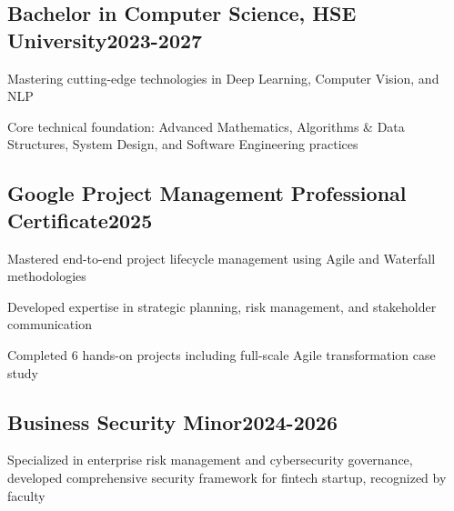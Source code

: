 \subsection{{Bachelor in Computer Science, HSE University}\hfill 2023-2027}
\begin{zitemize}
\item Mastering cutting-edge technologies in Deep Learning, Computer Vision, and NLP
\item Core technical foundation: Advanced Mathematics, Algorithms \& Data Structures, System Design, and Software Engineering practices
\end{zitemize}

\vspace*{6pt}

\subsection{Google Project Management Professional Certificate\hfill 2025}
\begin{zitemize}
\item Mastered end-to-end project lifecycle management using Agile and Waterfall methodologies
\item Developed expertise in strategic planning, risk management, and stakeholder communication
\item Completed 6 hands-on projects including full-scale Agile transformation case study
\end{zitemize}

\vspace*{6pt}

\subsection{{Business Security Minor}\hfill 2024-2026}
\begin{zitemize}
Specialized in enterprise risk management and cybersecurity governance, developed comprehensive security framework for fintech startup, recognized by faculty
\end{zitemize}

\vspace*{6pt}


